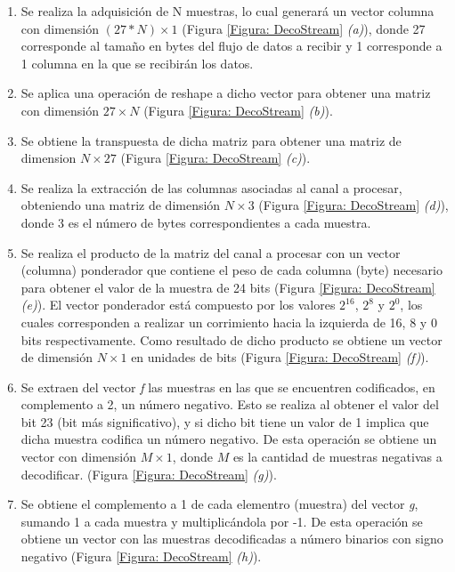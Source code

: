\begin{enumerate}
	\item Se realiza la adquisición de N muestras, lo cual generará un vector columna con dimensión $(27*N)\times 1$ (Figura \ref{Figura: DecoStream} \emph{(a)}), donde 27 corresponde al tamaño en bytes del flujo de datos a recibir y 1 corresponde a 1 columna en la que se recibirán los datos. %
	
	\item Se aplica una operación de reshape a dicho vector para obtener una matriz con dimensión $27\times N$ (Figura \ref{Figura: DecoStream} \emph{(b)}). %
	
	\item Se obtiene la transpuesta de dicha matriz para obtener una matriz de dimension $N\times 27$ (Figura \ref{Figura: DecoStream} \emph{(c)}). %
	
	\item Se realiza la extracción de las columnas asociadas al canal a procesar, obteniendo una matriz de dimensión $N\times 3$ (Figura \ref{Figura: DecoStream} \emph{(d)}), donde 3 es el número de bytes correspondientes a cada muestra. %
	
	\item Se realiza el producto de la matriz del canal a procesar con un vector (columna) ponderador que contiene el peso de cada columna (byte) necesario para obtener el valor de la muestra de 24 bits (Figura \ref{Figura: DecoStream} \emph{(e)}). El vector ponderador está compuesto por los valores $2^{16}$, $2^8$ y $2^0$, los cuales corresponden a realizar un corrimiento hacia la izquierda de 16, 8 y 0 bits respectivamente. Como resultado de dicho producto se obtiene un vector de dimensión $N\times 1$ en unidades de bits (Figura \ref{Figura: DecoStream} \emph{(f)}). %
	
	\item Se extraen del vector \emph{f} las muestras en las que se encuentren codificados, en complemento a 2, un número negativo. Esto se realiza al obtener el valor del bit 23 (bit más significativo), y si dicho bit tiene un valor de 1 implica que dicha muestra codifica un número negativo. De esta operación se obtiene un vector con dimensión $M\times 1$, donde $M$ es la cantidad de muestras negativas a decodificar. (Figura \ref{Figura: DecoStream} \emph{(g)}).
	
	\item Se obtiene el complemento a 1 de cada elementro (muestra) del vector \emph{g}, sumando 1 a cada muestra y multiplicándola por -1. De esta operación se obtiene un vector con las muestras decodificadas a número binarios con signo negativo (Figura \ref{Figura: DecoStream} \emph{(h)}).
	

\end{enumerate}
